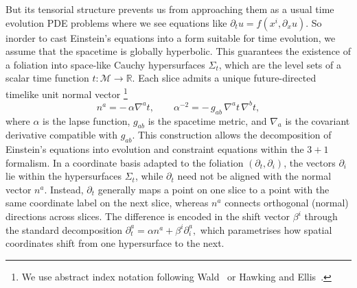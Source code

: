 \documentclass[11pt]{article}
\begin{document}
But its tensorial structure prevents us from approaching them as a usual time evolution PDE problems where we see equations like $\partial_t u =f(x^i,\partial_x u)$. So inorder to cast Einstein's equations into a form suitable for time evolution, we assume 
that the spacetime is globally hyperbolic. This guarantees the existence of a 
foliation into space-like Cauchy hypersurfaces $\Sigma_t$, which are the level 
sets of a scalar time function $t : \mathcal{M} \to \mathbb{R}$. Each slice 
admits a unique future-directed timelike unit normal vector \footnote{We use 
abstract index notation following Wald~\cite{wald} or Hawking and Ellis~\cite{hawkingellis}.} 
\[
n^a = -\,\alpha \nabla^a t, \qquad 
\alpha^{-2} = -\,g_{ab}\, \nabla^a t\, \nabla^b t,
\]
where $\alpha$ is the lapse function, $g_{ab}$ is the spacetime metric, and 
$\nabla_a$ is the covariant derivative compatible with $g_{ab}$. This 
construction allows the decomposition of Einstein's equations into evolution and 
constraint equations within the $3+1$ formalism. In a coordinate basis adapted 
to the foliation $(\partial_t,\partial_i)$, the vectors $\partial_i$ lie within 
the hypersurfaces $\Sigma_t$, while $\partial_t$ need not be aligned with the 
normal vector $n^a$. Instead, $\partial_t$ generally maps a point on one slice 
to a point with the same coordinate label on the next slice, whereas $n^a$ 
connects orthogonal (normal) directions across slices. The difference is encoded 
in the shift vector $\beta^i$ through the standard decomposition $\partial_t^a = \alpha n^a + \beta^i \partial_i^a,$ which parametrises how spatial coordinates shift from one hypersurface to the 
next.
\end{document}
